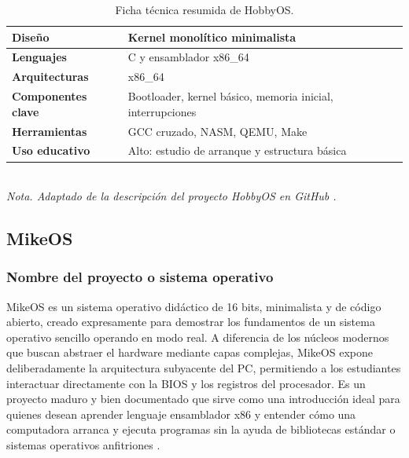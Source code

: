 \begin{table}[H]
    \centering
    \caption{Ficha técnica resumida de HobbyOS.}
    \vspace{2mm}
    \begin{tabular}{p{4cm}p{10cm}}
        \hline
        \textbf{Diseño}            & Kernel monolítico minimalista                             \\ \hline
        \textbf{Lenguajes}         & C y ensamblador x86\_64                                   \\
        \textbf{Arquitecturas}     & x86\_64                                                   \\
        \textbf{Componentes clave} & Bootloader, kernel básico, memoria inicial, interrupciones \\
        \textbf{Herramientas}      & GCC cruzado, NASM, QEMU, Make                             \\
        \textbf{Uso educativo}     & Alto: estudio de arranque y estructura básica             \\
        \hline
    \end{tabular}
    \vspace{1mm} \\
    \textit{Nota. Adaptado de la descripción del proyecto HobbyOS en GitHub \cite{hobbyos_repo, hobbyos_topics}.}
\end{table}

\subsection{MikeOS}

\subsubsection{Nombre del proyecto o sistema operativo}

MikeOS es un sistema operativo didáctico de 16 bits, minimalista y de código abierto, creado expresamente para demostrar los fundamentos de un sistema operativo sencillo operando en modo real. A diferencia de los núcleos modernos que buscan abstraer el hardware mediante capas complejas, MikeOS expone deliberadamente la arquitectura subyacente del PC, permitiendo a los estudiantes interactuar directamente con la BIOS y los registros del procesador. Es un proyecto maduro y bien documentado que sirve como una introducción ideal para quienes desean aprender lenguaje ensamblador x86 y entender cómo una computadora arranca y ejecuta programas sin la ayuda de bibliotecas estándar o sistemas operativos anfitriones \cite{mikeos_about}.

